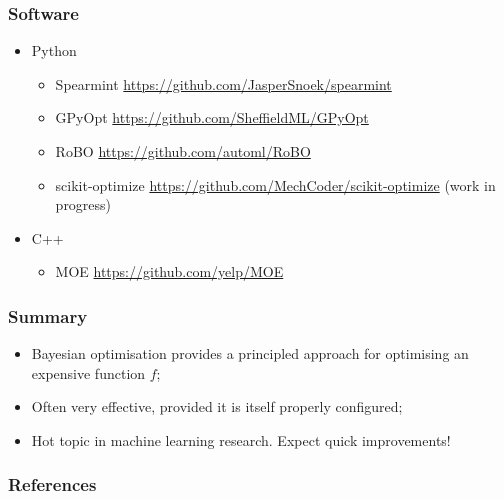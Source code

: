 \documentclass{beamer}
\begin{document}
\begin{frame}
    \frametitle{Software}

    \begin{itemize}
        \item Python
        \begin{itemize}\scriptsize
            \item Spearmint \url{https://github.com/JasperSnoek/spearmint}
            \item GPyOpt \url{https://github.com/SheffieldML/GPyOpt}
            \item RoBO \url{https://github.com/automl/RoBO}
            \item scikit-optimize \url{https://github.com/MechCoder/scikit-optimize} (work in progress)
        \end{itemize}

        \item C++
        \begin{itemize}\scriptsize
            \item MOE \url{https://github.com/yelp/MOE}
        \end{itemize}
    \end{itemize}

\end{frame}

\begin{frame}
    \frametitle{Summary}

    \begin{itemize}
        \item Bayesian optimisation provides a principled approach for optimising an expensive function $f$;

        \vspace{1em}

        \item Often very effective, provided it is itself properly configured;

        \vspace{1em}

        \item Hot topic in machine learning research. Expect quick improvements!

    \end{itemize}

\end{frame}

\begin{frame}
    \frametitle{References}
    \nocite{brochu2010tutorial}
    \nocite{shahriari2016taking}
    {\footnotesize
    
    }
\end{frame}
\end{document}
